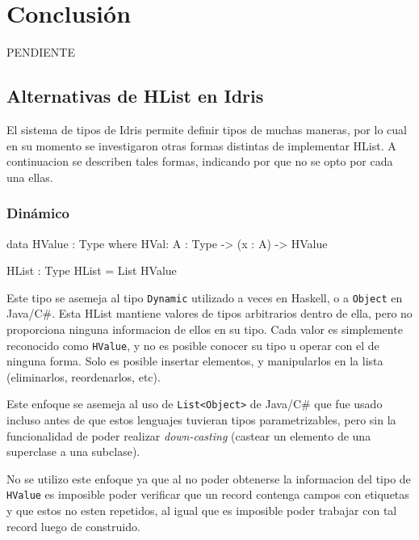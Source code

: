 
\chapter{Conclusión}
\label{ch:5}

PENDIENTE


\section{Alternativas de HList en Idris}

El sistema de tipos de Idris permite definir tipos de muchas maneras, por lo cual en su momento se investigaron otras formas distintas de implementar HList.
A continuacion se describen tales formas, indicando por que no se opto por cada una ellas.

\subsection{Dinámico}

\begin{code}
data HValue : Type where
    HVal: {A : Type} -> (x : A) -> HValue

HList : Type
HList = List HValue 
\end{code}

Este tipo se asemeja al tipo \texttt{Dynamic} utilizado a veces en Haskell, o a \texttt{Object} en Java/C\#. Esta HList mantiene valores de tipos arbitrarios dentro de ella, pero no proporciona ninguna informacion de ellos en su tipo. Cada valor es simplemente reconocido como \texttt{HValue}, y no es posible conocer su tipo u operar con el de ninguna forma. Solo es posible insertar elementos, y manipularlos en la lista (eliminarlos, reordenarlos, etc).

Este enfoque se asemeja al uso de \texttt{List<Object>} de Java/C\# que fue usado incluso antes de que estos lenguajes tuvieran tipos parametrizables, pero sin la funcionalidad de poder realizar \textit{down-casting} (castear un elemento de una superclase a una subclase).

No se utilizo este enfoque ya que al no poder obtenerse la informacion del tipo de \texttt{HValue} es imposible poder verificar que un record contenga campos con etiquetas y que estos no esten repetidos, al igual que es imposible poder trabajar con tal record luego de construido.


